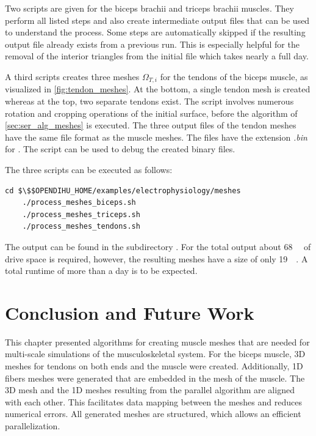 \begin{reproduce}
  Two scripts are given for the biceps brachii and triceps brachii muscles. They perform all listed steps and also create intermediate output files that can be used to understand the process. Some steps are automatically skipped if the resulting output file already exists from a previous run. This is especially helpful for the removal of the interior triangles from the initial file which takes nearly a full day.
  
  A third scripts creates three meshes $\Omega_{T,i}$ for the tendons of the biceps muscle, as visualized in \cref{fig:tendon_meshes}. At the bottom, a single tendon mesh is created whereas at the top, two separate tendons exist. The script involves numerous rotation and cropping operations of the initial surface, before the algorithm of \cref{sec:ser_alg_meshes} is executed. The three output files of the tendon meshes have the same file format as the muscle meshes. The files have the extension \emph{.bin} for . The script  can be used to debug the created binary files.
  
  The three scripts can be executed as follows:
  \begin{lstlisting}[columns=fullflexible,breaklines=true,postbreak=\mbox{\textcolor{gray}{$\hookrightarrow$}\space}]
    cd $\$$OPENDIHU_HOME/examples/electrophysiology/meshes
    ./process_meshes_biceps.sh
    ./process_meshes_triceps.sh
    ./process_meshes_tendons.sh
  \end{lstlisting}
  The output can be found in the subdirectory . For the total output about \SI{68}{\gibi\byte} of drive space is required, however, the resulting meshes have a size of only \SI{19}{\gibi\byte}. A total runtime of more than a day is to be expected.
  
\end{reproduce}

\section{Conclusion and Future Work}\label{sec:meshes_summary_and_conclusion}

This chapter presented algorithms for creating muscle meshes that are needed for multi-scale simulations of the musculoskeletal system.
For the biceps muscle, 3D meshes for tendons on both ends and the muscle were created. Additionally, 1D fibers meshes were generated that are embedded in the mesh of the muscle. The 3D mesh and the 1D meshes resulting from the parallel algorithm are aligned with each other. This facilitates data mapping between the meshes and reduces numerical errors. All generated meshes are structured, which allows an efficient parallelization.

